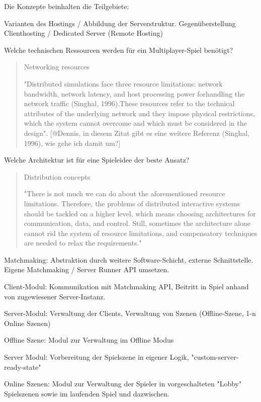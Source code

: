 Die Konzepte beinhalten die Teilgebiete: 

Varianten des Hostings / Abbildung der Serverstruktur. Gegenüberstellung Clienthosting / Dedicated Server (Remote Hosting)

Welche technischen Ressourcen werden für ein Multiplayer-Spiel benötigt?

\begin{quote}
Networking resources
	
"Distributed simulations face three resource limitations: network bandwidth, network 
latency, and host processing power forhandling the network traffic (Singhal, 1996).These resources refer to the technical attributes of the underlying network and they impose physical restrictions, which the system cannot overcome and which must be considered in the design". \cite{Smed.2002} [@Dennis, in diesem Zitat gibt es eine weitere Referenz (Singhal, 1996), wie gehe ich damit um?]
\end{quote}

Welche Architektur ist für eine Spieleidee der beste Ansatz? 

\begin{quote}
Distribution concepts

"There is not much we can do about the aforementioned resource limitations. Therefore, the problems of distributed interactive systems should be tackled on a higher level, which means choosing architectures for communication, data, and control. Still, sometimes the architecture alone cannot rid the system of resource limitations, and compensatory techniques are needed to relax the requirements." \cite{Smed.2002}
\end{quote}

Matchmaking: Abstraktion durch weitere Software-Schicht, externe Schnittstelle. Eigene Matchmaking / Server Runner API umsetzen.

Client-Modul: Kommunikation mit Matchmaking API, Beitritt in Spiel anhand von zugewiesener Server-Instanz.

Server-Modul: Verwaltung der Clients, Verwaltung von Szenen (Offline-Szene, 1-n Online Szenen)

Offline Szene: Modul zur Verwaltung im Offline Modus

Server Modul: Vorbereitung der Spielszene in eigener Logik, "custom-server-ready-state"

Online Szenen: Modul zur Verwaltung der Spieler in vorgeschalteten "Lobby" Spielszenen sowie im laufenden Spiel und dazwischen.

